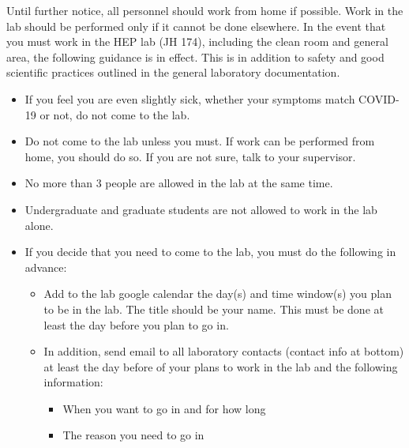 Until further notice, all personnel should work from home if possible.  Work in the lab should be performed only if it cannot be done elsewhere.  In the event that you must work in the HEP lab (JH 174), including the clean room and general area, the following guidance is in effect.  This is in addition to safety and good scientific practices outlined in the general laboratory documentation.

\begin{itemize}
\item If you feel you are even slightly sick, whether your symptoms match COVID-19 or not, do not come to the lab.
\item Do not come to the lab unless you must. If work can be performed from home, you should do so.  If you are not sure, talk to your supervisor.
\item No more than 3 people are allowed in the lab at the same time.
\item Undergraduate and graduate students are not allowed to work in the lab alone.
\item If you decide that you need to come to the lab, you must do the following in advance:
    \begin{itemize}
    \item Add to the lab google calendar the day(s) and time window(s) you plan to be in the lab.  The title should be your name.  This must be done at least the day before you plan to go in.
    \item In addition, send email to all laboratory contacts (contact info at bottom) at least the day before of your plans to work in the lab and the following information:
    
    	    \begin{itemize}
	    	\item When you want to go in and for how long
		\item The reason you need to go in
	    \end{itemize}


\end{itemize}
\end{itemize}
